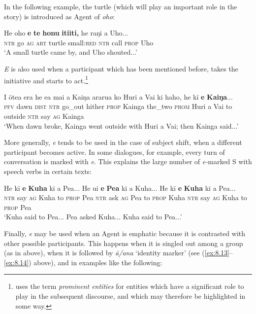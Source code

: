 {In the following example, the turtle (which will play an important role in the story) is introduced as Agent of \textit{oho}:

\ea\label{ex:8.20}
\gll He oho \textbf{e} \textbf{te} \textbf{honu} \textbf{{\ꞌ}iti{\ꞌ}iti,} he raŋi a Uho...\\
\textsc{ntr} go \textsc{ag} \textsc{art} turtle small:\textsc{red} \textsc{ntr} call \textsc{prop} Uho\\

\glt
‘A small turtle came by, and Uho shouted...’ \textstyleExampleref{[Mtx-7-12.007]}
\z

\textit{E} is also used when a participant which has been mentioned before, takes the initiative and starts to act.\footnote{\label{fn:399}\citet[61]{Levinsohn2007} uses the term \textit{prominent entities} for entities which have a significant role to play in the subsequent discourse, and which may therefore be highlighted in some way.}

\ea\label{ex:8.21}
\gll I {\ꞌ}ōtea era he e{\ꞌ}a mai a Kaiŋa ararua ko Huri {\ꞌ}a Vai ki haho, he kī \textbf{e} \textbf{Kaiŋa}...\\
\textsc{pfv} dawn \textsc{dist} \textsc{ntr} go\_out hither \textsc{prop} Kainga the\_two \textsc{prom} Huri a Vai to outside \textsc{ntr} say \textsc{ag} Kainga\\

\glt
‘When dawn broke, Kainga went outside with Huri a Vai; then Kainga said...’ \textstyleExampleref{[R304.017]} 
\z

More generally, \textit{e} tends to be used in the case of subject shift, when a different participant becomes active. In some dialogues, for example, every turn of conversation is marked with \textit{e}. This explains the large number of \textit{e-}marked S with speech verbs in certain texts:

\ea\label{ex:8.22}
\gll He kī \textbf{e} \textbf{Kuha} ki a Pea... He {\ꞌ}ui \textbf{e} \textbf{Pea} ki a Kuha... He kī \textbf{e} \textbf{Kuha} ki a Pea...\\
\textsc{ntr} say \textsc{ag} Kuha to \textsc{prop} Pea \textsc{ntr} ask \textsc{ag} Pea to \textsc{prop} Kuha \textsc{ntr} say \textsc{ag} Kuha to \textsc{prop} Pea\\

\glt
‘Kuha said to Pea... Pea asked Kuha... Kuha said to Pea...’ \textstyleExampleref{[R229.034–038]}
\z

Finally, \textit{e} may be used when an Agent is emphatic because it is contrasted with other possible participants. This happens when it is singled out among a group (as in  above), when it is followed by \textit{{\ꞌ}ā/{\ꞌ}ana} ‘identity marker’ (see (\ref{ex:8.13}–\ref{ex:8.14}) above), and in examples like the following:

}
